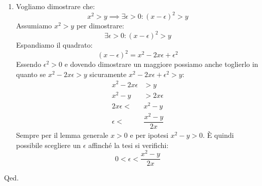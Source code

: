 {\begin{enumerate}[label=(\Alph*)]
	\item Vogliamo dimostrare che:
		\begin{equation*}
			x^2 > y \implies \exists \epsilon > 0: (x - \epsilon)^2 > y
		\end{equation*}
		Assumiamo $x^2 > y$ per dimostrare:
		\begin{equation*}
			\exists \epsilon > 0: (x - \epsilon)^2 > y
		\end{equation*}
		Espandiamo il quadrato:
		\begin{equation*}
			(x-\epsilon)^2 = x^2 -2x\epsilon + \epsilon^2
		\end{equation*}
		Essendo $\epsilon^2 > 0$ e dovendo dimostrare un maggiore possiamo anche toglierlo in quanto se $x^2 -2x\epsilon > y$ sicuramente $x^2 -2x\epsilon + \epsilon^2 > y$:
		\begin{align*}
			x^2 -2x\epsilon &> y\\
			x^2 - y &> 2x\epsilon\\
			2x\epsilon < &x^2 - y\\
			\epsilon < &\dfrac{x^2-y}{2x}
		\end{align*}
		Sempre per il lemma generale $x > 0$ e per ipotesi $x^2-y > 0$. È quindi possibile scegliere un $\epsilon$ affinché la tesi si verifichi:
		\begin{equation*}
			0 < \epsilon < \dfrac{x^2-y}{2x}
		\end{equation*}
\end{enumerate}
\hfill Qed.
}    


